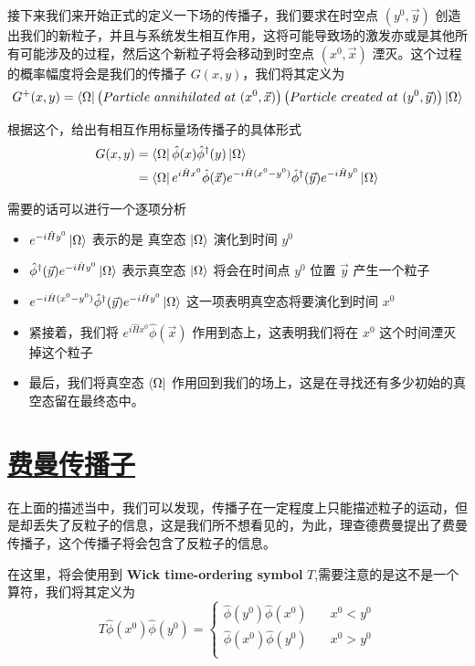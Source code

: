 接下来我们来开始正式的定义一下场的传播子，我们要求在时空点 $(y^0,\vec{y})$ 创造出我们的新粒子，并且与系统发生相互作用，这将可能导致场的激发亦或是其他所有可能涉及的过程，然后这个新粒子将会移动到时空点 $(x^0,\vec{x})$ 湮灭。这个过程的概率幅度将会是我们的传播子 $G(x,y)$，我们将其定义为 
\begin{equation*}
    G^{+}(x,y) = \bra{\Omega}\left( Particle\ annihilated\ at\ (x^0,\vec{x})\right)\left(Particle\ created\ at\ (y^0,\vec{y})\right)\ket{\Omega}
\end{equation*}

根据这个，给出有相互作用标量场传播子的具体形式
\begin{align*}
    G(x,y) &= \bra{\Omega}\hat{\phi}(x)\hat{\phi}^\dagger(y)\ket{\Omega} \\
    &= \bra{\Omega}e^{i\hat{H}x^0}\hat{\phi}(\vec{x})e^{-i\hat{H}(x^0 - y^0)}\hat{\phi}^\dagger(\vec{y})e^{-i\hat{H}y^0}\ket{\Omega} 
\end{align*}

需要的话可以进行一个逐项分析
\begin{itemize}
    \item $e^{-i\hat{H}y^0}\ket{\Omega}$ 表示的是 真空态 $\ket{\Omega}$ 演化到时间 $y^0$
    \item $\hat{\phi}^\dagger(\vec{y})e^{-i\hat{H}y^0}\ket{\Omega}$ 表示真空态 $\ket{\Omega}$ 将会在时间点 $y^0$ 位置 $\vec{y}$ 产生一个粒子
    \item $e^{-i\hat{H}(x^0 - y^0)}\hat{\phi}^\dagger(\vec{y})e^{-i\hat{H}y^0}\ket{\Omega}$ 这一项表明真空态将要演化到时间 $x^0$
    \item 紧接着，我们将 $e^{i\hat{H}x^0}\hat{\phi}(\vec{x})$ 作用到态上，这表明我们将在 $x^0$ 这个时间湮灭掉这个粒子
    \item 最后，我们将真空态 $\bra{\Omega}$ 作用回到我们的场上，这是在寻找还有多少初始的真空态留在最终态中。
\end{itemize}


\section{\protect\hyperlink{:}{费曼传播子}}

在上面的描述当中，我们可以发现，传播子在一定程度上只能描述粒子的运动，但是却丢失了反粒子的信息，这是我们所不想看见的，为此，理查德费曼提出了费曼传播子，这个传播子将会包含了反粒子的信息。

在这里，将会使用到 \textbf{Wick time-ordering symbol} $T$,需要注意的是这不是一个算符，我们将其定义为
\begin{equation*}
    T\hat{\phi}(x^0)\hat{\phi}(y^0) =
    \begin{cases}
        \hat{\phi}(y^0)\hat{\phi}(x^0) &\quad x^0 < y^0 \\
        \hat{\phi}(x^0)\hat{\phi}(y^0) &\quad x^0 > y^0 \\
    \end{cases}
\end{equation*}

